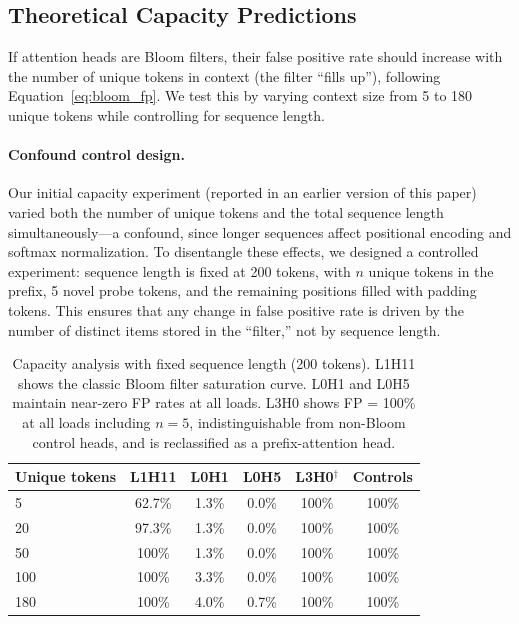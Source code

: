 \documentclass[11pt]{article}
\begin{document}
\subsection{Theoretical Capacity Predictions}
\label{sec:capacity}

If attention heads are Bloom filters, their false positive rate should increase with the number of unique tokens in context (the filter ``fills up''), following Equation~\ref{eq:bloom_fp}. We test this by varying context size from 5 to 180 unique tokens while controlling for sequence length.

\paragraph{Confound control design.} Our initial capacity experiment (reported in an earlier version of this paper) varied both the number of unique tokens and the total sequence length simultaneously---a confound, since longer sequences affect positional encoding and softmax normalization. To disentangle these effects, we designed a controlled experiment: sequence length is fixed at 200 tokens, with $n$ unique tokens in the prefix, 5 novel probe tokens, and the remaining positions filled with padding tokens. This ensures that any change in false positive rate is driven by the number of distinct items stored in the ``filter,'' not by sequence length.

\begin{table}[h]
\centering
\caption{Capacity analysis with fixed sequence length (200 tokens). L1H11 shows the classic Bloom filter saturation curve. L0H1 and L0H5 maintain near-zero FP rates at all loads. L3H0 shows FP = 100\% at all loads including $n = 5$, indistinguishable from non-Bloom control heads, and is reclassified as a prefix-attention head.}
\label{tab:capacity}
\begin{tabular}{lccccc}
\toprule
Unique tokens & L1H11 & L0H1 & L0H5 & L3H0$^\dagger$ & Controls \\
\midrule
5   & 62.7\% & 1.3\% & 0.0\% & 100\% & 100\% \\
20  & 97.3\% & 1.3\% & 0.0\% & 100\% & 100\% \\
50  & 100\%  & 1.3\% & 0.0\% & 100\% & 100\% \\
100 & 100\%  & 3.3\% & 0.0\% & 100\% & 100\% \\
180 & 100\%  & 4.0\% & 0.7\% & 100\% & 100\% \\
\bottomrule
\end{tabular}
\end{table}
\end{document}
